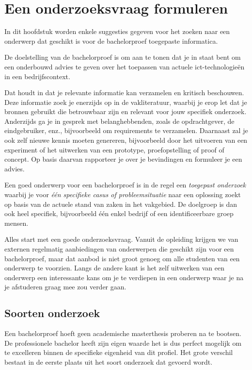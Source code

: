 \chapter{Een onderzoeksvraag formuleren}%
\label{ch:onderzoeksvraag}

In dit hoofdstuk worden enkele suggesties gegeven voor het zoeken naar een onderwerp dat geschikt is voor de bachelorproef toegepaste informatica.

De doelstelling van de bachelorproef is om aan te tonen dat je in staat bent om een onderbouwd advies te geven over het toepassen van actuele ict-technologieën in een bedrijfscontext.

Dat houdt in dat je relevante informatie kan verzamelen en kritisch beschouwen. Deze informatie zoek je enerzijds op in de vakliteratuur, waarbij je erop let dat je bronnen gebruikt die betrouwbaar zijn en relevant voor jouw specifiek onderzoek. Anderzijds ga je in gesprek met belanghebbenden, zoals de opdrachtgever, de eindgebruiker, enz., bijvoorbeeld om requirements te verzamelen. Daarnaast zal je ook zelf nieuwe kennis moeten genereren, bijvoorbeeld door het uitvoeren van een experiment of het uitwerken van een prototype, proefopstelling of proof of concept. Op basis daarvan rapporteer je over je bevindingen en formuleer je een advies.

Een goed onderwerp voor een bachelorproef is in de regel een \emph{toegepast onderzoek} waarbij je voor \emph{één specifieke casus of probleemsituatie} naar een oplossing zoekt op basis van de actuele stand van zaken in het vakgebied. De doelgroep is dan ook heel specifiek, bijvoorbeeld één enkel bedrijf of een identificeerbare groep mensen.

Alles start met een goede onderzoeksvraag. Vanuit de opleiding krijgen we van externen regelmatig aanbiedingen van onderwerpen die geschikt zijn voor een bachelorproef, maar dat aanbod is niet groot genoeg om alle studenten van een onderwerp te voorzien. Langs de andere kant is het zelf uitwerken van een onderwerp een interessante kans om je te verdiepen in een onderwerp waar je na je afstuderen graag mee zou verder gaan.

\section{Soorten onderzoek}%
\label{sec:soorten-onderzoek}

Een bachelorproef hoeft geen academische masterthesis proberen na te bootsen. De professionele bachelor heeft zijn eigen waarde het is dus perfect mogelijk om te excelleren binnen de specifieke eigenheid van dit profiel. Het grote verschil bestaat in de eerste plaats uit het soort onderzoek dat gevoerd wordt.

